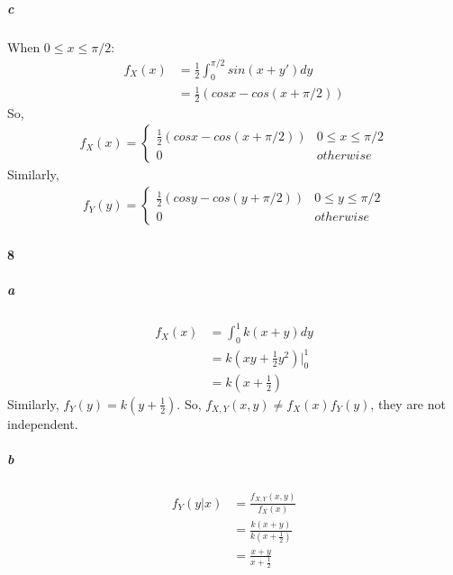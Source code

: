 \documentclass[22pt]{article}
\begin{document}
		\subparagraph{c}
		When $0\leq x \leq \pi/2 $:
		\begin{align}
		f_X(x) & = \frac{1}{2}\int_{0}^{\pi/2}sin(x+y')dy\\
		& = \frac{1}{2}(cosx - cos(x+\pi/2))
		\end{align}
	    	So,\begin{align}
    f_X(x) = 
				\begin{cases}
				\frac{1}{2}(cosx - cos(x+\pi/2))& 0\leq x \leq \pi/2 \\
				0 & otherwise
				\end{cases}
	\end{align}
	 Similarly,\begin{align}
    f_Y(y) = 
				\begin{cases}
				\frac{1}{2}(cosy - cos(y+\pi/2))& 0\leq y \leq \pi/2 \\
				0 & otherwise
				\end{cases}
	\end{align}

	\paragraph{8}		
	 \subparagraph{a} 
	 \begin{align}
	 f_X(x) & = \int_{0}^{1}k(x+y)dy\\
	 & = k( xy + \frac{1}{2}y^2)|^1_0 \\
	 & = k(x+ \frac{1}{2})
	 \end{align}
	 Similarly, $f_Y(y) = k(y+ \frac{1}{2})$.
	 So, $f_{X,Y}(x,y) \not= f_X(x)f_Y(y)$, they are not independent.		

	 \subparagraph{b}
	 \begin{align}
	 f_Y(y|x) & = \frac{f_{X,Y}(x,y)}{f_X(x)}\\
	 & = \frac{k(x+y)}{k(x+\frac{1}{2})}\\
	 & = \frac{x+y}{x+\frac{1}{2}}
		 \end{align}
\end{document}
